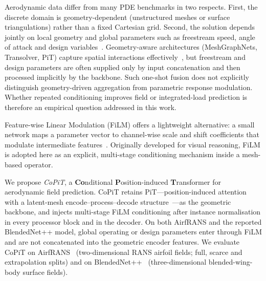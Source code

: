 \documentclass[final,3p,times]{elsarticle}
\begin{document}
Aerodynamic data differ from many PDE benchmarks in two respects. First, the discrete domain is geometry-dependent (unstructured meshes or surface triangulations) rather than a fixed Cartesian grid. Second, the solution depends jointly on local geometry and global parameters such as freestream speed, angle of attack and design variables~\cite{bhatnagar2019cnn_aero,thuerey2020deepcfd,bonnet2022airfrans,sung2025blendednetpp}. Geometry-aware architectures (MeshGraphNets, Transolver, PiT) capture spatial interactions effectively~\cite{pfaff2021learning,wu2024transolver,chen2024pit}, but freestream and design parameters are often supplied only by input concatenation and then processed implicitly by the backbone. Such one-shot fusion does not explicitly distinguish geometry-driven aggregation from parametric response modulation. Whether repeated conditioning improves field or integrated-load prediction is therefore an empirical question addressed in this work.

Feature-wise Linear Modulation (FiLM) offers a lightweight alternative: a small network maps a parameter vector to channel-wise scale and shift coefficients that modulate intermediate features~\cite{perez2018film,dumoulin2018film_survey}. Originally developed for visual reasoning, FiLM is adopted here as an explicit, multi-stage conditioning mechanism inside a mesh-based operator.

We propose \emph{CoPiT}, a \textbf{Co}nditional \textbf{P}osition-induced \textbf{T}ransformer for aerodynamic field prediction. CoPiT retains PiT---position-induced attention with a latent-mesh encode--process--decode structure~\cite{chen2024pit}---as the geometric backbone, and injects multi-stage FiLM conditioning after instance normalisation in every processor block and in the decoder. On both AirfRANS and the reported BlendedNet++ model, global operating or design parameters enter through FiLM and are not concatenated into the geometric encoder features. We evaluate CoPiT on AirfRANS~\cite{bonnet2022airfrans} (two-dimensional RANS airfoil fields; full, scarce and extrapolation splits) and on BlendedNet++~\cite{sung2025blendednetpp} (three-dimensional blended-wing-body surface fields).
\end{document}
